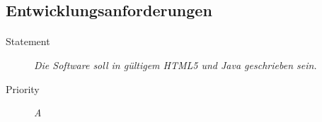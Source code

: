 \subsection{Entwicklungsanforderungen}

\paragraph{}
\begin{description}
\item [Statement] \textit{Die Software soll in gültigem HTML5 und
    Java geschrieben sein.}
\item [Priority] \textit{A}
\end{description}
